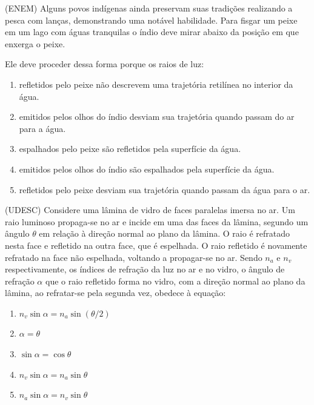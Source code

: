 \begin{prob}(ENEM)
    Alguns povos indígenas ainda preservam suas tradições realizando a pesca com lanças, demonstrando uma notável habilidade. Para fisgar um peixe em um lago com águas tranquilas o índio deve mirar abaixo da posição em que enxerga o peixe.

    \noindent Ele deve proceder dessa forma porque os raios de luz:
    \begin{enumerate}[label=\alph *)]
        \item refletidos pelo peixe não descrevem uma trajetória retilínea no interior da água.
        \item emitidos pelos olhos do índio desviam sua trajetória quando passam do ar para a água.
        \item espalhados pelo peixe são refletidos pela superfície da água.
        \item emitidos pelos olhos do índio são espalhados pela superfície da água.
        \item refletidos pelo peixe desviam sua trajetória quando passam da água para o ar.
    \end{enumerate}
\end{prob}
\begin{prob}(UDESC)
    Considere uma lâmina de vidro de faces paralelas imersa no ar. Um raio luminoso propaga-se no ar e incide em uma das faces da lâmina, segundo um ângulo  $\theta$ em relação à direção normal ao plano da lâmina. O raio é refratado nesta face e refletido na outra face, que é espelhada. O raio refletido é novamente refratado na face não espelhada, voltando a propagar-se no ar. Sendo $n_{a}$ e $n_{v}$   respectivamente, os índices de refração da luz no ar e no vidro, o ângulo de refração $\alpha$ que o raio refletido forma no vidro, com a direção normal ao plano da lâmina, ao refratar-se pela segunda vez, obedece à equação:
    \begin{enumerate}[label=\alph *)]
        \item $n_{v}\sin\alpha=n_{a}\sin(\theta /2)$
        \item $\alpha=\theta$
        \item $\sin\alpha=\cos\theta$
        \item $n_v\sin\alpha=n_a\sin\theta$
        \item $n_a\sin\alpha=n_v\sin\theta$
    \end{enumerate}
\end{prob}